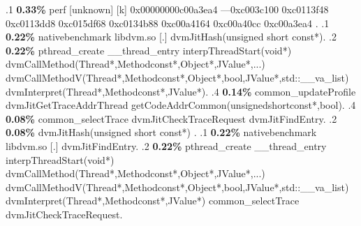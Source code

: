 \begin{profile}
{.1 \textbf{ 0.33\%} perf             [unknown]              [k] 0x00000000c00a3ea4\newline {} ---0xc003c100\newline {} 0xc0113f48\newline {} 0xc0113dd8\newline {} 0xc015df68\newline {} 0xc0134b88\newline {} 0xc00a4164\newline {} 0xc00a40cc\newline {} 0xc00a3ea4\newline {} . 
.1 \textbf{ 0.22\%} nativebenchmark  libdvm.so              [.] dvmJitHash(unsigned short const*). 
.2 \textbf{0.22\%} pthread\_create\newline {} \_\_thread\_entry\newline {} interpThreadStart(void*)\newline {} dvmCallMethod(Thread*,Methodconst*,Object*,JValue*,...)\newline {} dvmCallMethodV(Thread*,Methodconst*,Object*,bool,JValue*,std::\_\_va\_list)\newline {} dvmInterpret(Thread*,Methodconst*,JValue*). 
.4 \textbf{0.14\%} common\_updateProfile\newline {} dvmJitGetTraceAddrThread\newline {} getCodeAddrCommon(unsignedshortconst*,bool). 
.4 \textbf{0.08\%} common\_selectTrace\newline {} dvmJitCheckTraceRequest\newline {} dvmJitFindEntry. 
.2 \textbf{0.08\%} dvmJitHash(unsigned short const*)\newline {} . 
.1 \textbf{ 0.22\%} nativebenchmark  libdvm.so              [.] dvmJitFindEntry. 
.2 \textbf{0.22\%} pthread\_create\newline {} \_\_thread\_entry\newline {} interpThreadStart(void*)\newline {} dvmCallMethod(Thread*,Methodconst*,Object*,JValue*,...)\newline {} dvmCallMethodV(Thread*,Methodconst*,Object*,bool,JValue*,std::\_\_va\_list)\newline {} dvmInterpret(Thread*,Methodconst*,JValue*)\newline {} common\_selectTrace\newline {} dvmJitCheckTraceRequest. 
}
\end{profile}

